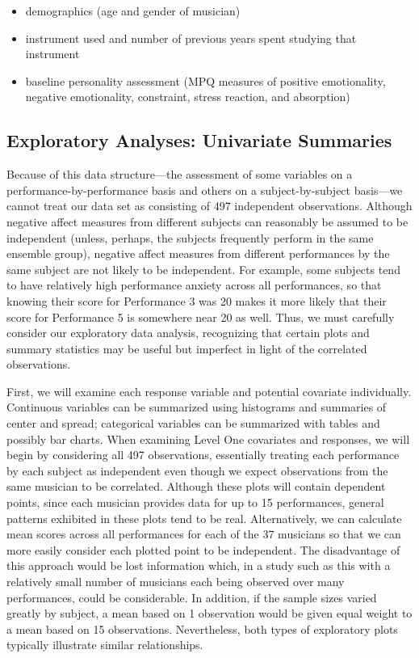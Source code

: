 \documentclass[
]{krantz}
\providecommand{\tightlist}{%
  \setlength{\itemsep}{0pt}\setlength{\parskip}{0pt}}
\begin{document}
\begin{itemize}
\tightlist
\item
  demographics (age and gender of musician)
\item
  instrument used and number of previous years spent studying that instrument
\item
  baseline personality assessment (MPQ measures of positive emotionality, negative emotionality, constraint, stress reaction, and absorption)
\end{itemize}

\hypertarget{explore1}{%
\subsection{Exploratory Analyses: Univariate Summaries}\label{explore1}}

Because of this data structure---the assessment of some variables on a performance-by-performance basis and others on a subject-by-subject basis---we cannot treat our data set as consisting of 497 independent observations. Although negative affect measures from different subjects can reasonably be assumed to be independent (unless, perhaps, the subjects frequently perform in the same ensemble group), negative affect measures from different performances by the same subject are not likely to be independent. For example, some subjects tend to have relatively high performance anxiety across all performances, so that knowing their score for Performance 3 was 20 makes it more likely that their score for Performance 5 is somewhere near 20 as well. Thus, we must carefully consider our exploratory data analysis, recognizing that certain plots and summary statistics may be useful but imperfect in light of the correlated observations.

First, we will examine each response variable and potential covariate individually. Continuous variables can be summarized using histograms and summaries of center and spread; categorical variables can be summarized with tables and possibly bar charts. When examining Level One covariates and responses, we will begin by considering all 497 observations, essentially treating each performance by each subject as independent even though we expect observations from the same musician to be correlated. Although these plots will contain dependent points, since each musician provides data for up to 15 performances, general patterns exhibited in these plots tend to be real. Alternatively, we can calculate mean scores across all performances for each of the 37 musicians so that we can more easily consider each plotted point to be independent. The disadvantage of this approach would be lost information which, in a study such as this with a relatively small number of musicians each being observed over many performances, could be considerable. In addition, if the sample sizes varied greatly by subject, a mean based on 1 observation would be given equal weight to a mean based on 15 observations. Nevertheless, both types of exploratory plots typically illustrate similar relationships.
\end{document}
